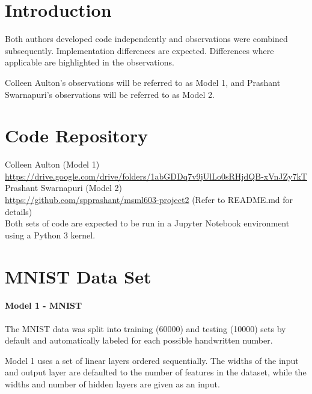 \documentclass[12pt]{article}
\begin{document}
\maketitle

\section{Introduction}

Both authors developed code independently and observations were combined subsequently. Implementation differences are expected. Differences where applicable are highlighted in the observations.

Colleen Aulton's observations will be referred to as Model 1, and Prashant Swarnapuri's observations will be referred to as Model 2.


\section{Code Repository}

Colleen Aulton (Model 1)\\
\href{https://drive.google.com/drive/folders/1abGDDq7v9jUlLo0sRHjdQB-xVnJZy7kT}{https://drive.google.com/drive/folders/1abGDDq7v9jUlLo0sRHjdQB-xVnJZy7kT}\\
Prashant Swarnapuri (Model 2)\\
\href{https://github.com/spprashant/msml603-project2}{https://github.com/spprashant/msml603-project2} (Refer to README.md for details)\\ 

Both sets of code are expected to be run in a Jupyter Notebook environment using a Python 3 kernel.

\section{MNIST Data Set}
 
\paragraph{Model 1 - MNIST}

The MNIST data was split into training (60000) and testing (10000) sets by default and automatically labeled for each possible handwritten number. 

Model 1 uses a set of linear layers ordered sequentially. The widths of the input and output layer are defaulted to the number of features in the dataset, while the widths and number of hidden layers are given as an input.
\end{document}
